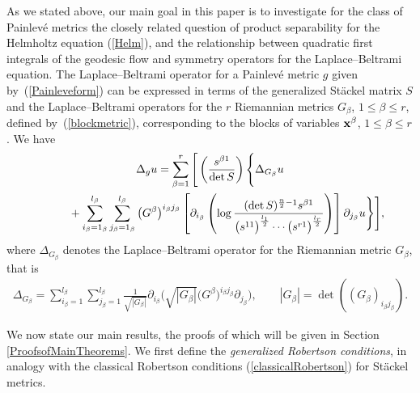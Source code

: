 \documentclass[pdftex]{sigma}
\numberwithin{equation}{section}
\newcommand{\lbeta}{l_{\beta}}
\begin{document}
As we stated above, our main goal in this paper is to investigate for the class of Painlev\'e metrics the closely related question of product separability for the Helmholtz equation (\ref{Helm}), and the relationship between quadratic first integrals of the geodesic flow and symmetry operators for the Laplace--Beltrami equation. The Laplace--Beltrami operator for a Painlev\'e metric $g$ given by~(\ref{Painleveform}) can be expressed in terms of the generalized St\"ackel matrix $S$ and the Laplace--Beltrami operators for the $r$ Riemannian metrics $G_{\beta}$, $1\leq \beta \leq r$, defined by~(\ref{blockmetric}), corresponding to the blocks of variables ${\bf x}^{\beta}$, $1\leq \beta \leq r$. We have
\begin{gather}
\Delta_{g} u =\sum_{\beta=1}^{r}\Bigg[\left(\frac{s^{\beta 1}}{\det S}\right)\Bigg\{\Delta_{G_{\beta}}u\nonumber\\
\hphantom{\Delta_{g} u =}{}+\sum_{i_{\beta}=1_{\beta}}^{l_{\beta}}\sum_{{j}_{\beta}=1_{\beta}}^{l_{\beta}}\big(G^{\beta}\big)^{i_{\beta} j_{\beta}}\left[\partial_{i_{\beta}}\left(\log \frac{(\det S)^{\frac{n}{2}-1}s^{\beta 1}}{\big(s^{11}\big)^{\frac{l_1}{2}} \cdots \big(s^{r1}\big)^{\frac{l_r}{2}}}\right)\right]\partial_{j_{\beta}}u\Bigg\}\Bigg],\label{Laplacian}
\end{gather}
where $\Delta_{G_{\beta}}$ denotes the Laplace--Beltrami operator for the Riemannian metric $G_{\beta}$, that is
\begin{gather*}%
\Delta_{G_{\beta}} = \sum_{i_{\beta}=1}^{\lbeta}\sum_{j_{\beta}=1}^{\lbeta}\frac{1}{\sqrt{|G_{\beta}|}}\partial_{i_{\beta}}\Big(\sqrt{|G_{\beta}|}
\big(G^{\beta}\big)^{i_{\beta}j_{\beta}}\partial_{j_{\beta}}\Big),\qquad |G_{\beta}|=\det((G_{\beta})_{i_{\beta}j_{\beta}}).
\end{gather*}

We now state our main results, the proofs of which will be given in Section \ref{ProofsofMainTheorems}. We first define the \emph{generalized Robertson conditions}, in analogy with the classical Robertson conditions (\ref{classicalRobertson}) for St\"ackel metrics.
\end{document}
